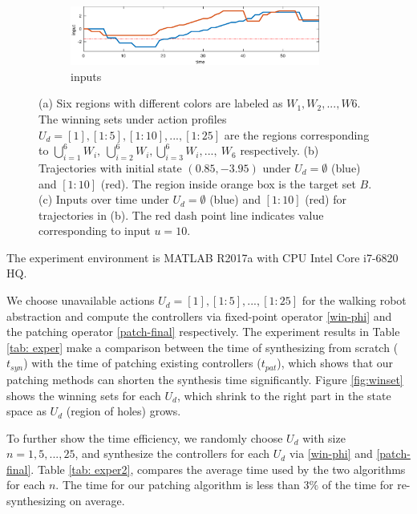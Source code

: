 \begin{figure}
\begin{subfigure}[b]{0.25\textwidth}
		\includegraphics[width=0.9\textwidth]{pic/input}
		\caption{inputs}
		\label{fig:input}
	\end{subfigure}
	\caption{(a) Six regions with different colors are labeled as $ W_1,W_2,...,W6 $. The winning sets under action profiles $U_d = [1], [1:5],[1:10],...,[1:25]$ are the regions corresponding to $ \bigcup_{i=1}^6 W_i,\ \bigcup_{i=2}^6 W_i,\bigcup_{i=3}^6 W_i,...,\ W_6 $ respectively. (b) Trajectories with initial state $ (0.85,-3.95) $ under $ U_d = \emptyset $ (blue) and $[1:10] $ (red). The region inside orange box is the target set $ B $. (c) Inputs over time under $ U_d = \emptyset $ (blue) and $ [1:10] $ (red) for trajectories in (b). The red dash point line indicates value corresponding to input $ u = 10 $.} %
\end{figure}

The experiment environment is MATLAB R2017a with CPU Intel Core  i7-6820 HQ.

We choose unavailable actions $ U_d= [1],[1:5],...,[1:25] $ for the {\color{black} walking} robot abstraction and compute the controllers via fixed-point operator \eqref{win-phi} and the patching operator \eqref{patch-final} respectively.  The experiment results in Table \ref{tab: exper} make a comparison between the time of synthesizing from scratch ($ t_{syn} $) with the time of patching existing controllers ($ t_{pat} $), which shows that our patching methods can shorten the synthesis time significantly. Figure \ref{fig:winset} shows the winning sets for each $ U_d $, which shrink to the right part in the state space as $ U_d $ (region of holes) grows.

To further show the time efficiency, we randomly choose $ U_d $ with size $n = 1,5,...,25 $, and synthesize the controllers for each $ U_d $ via \eqref{win-phi} and \eqref{patch-final}. Table \ref{tab: exper2}, compares the average time used by the two algorithms for each $ n $. The time for our patching algorithm is less than $ 3\% $ of the time for re-synthesizing on average.

